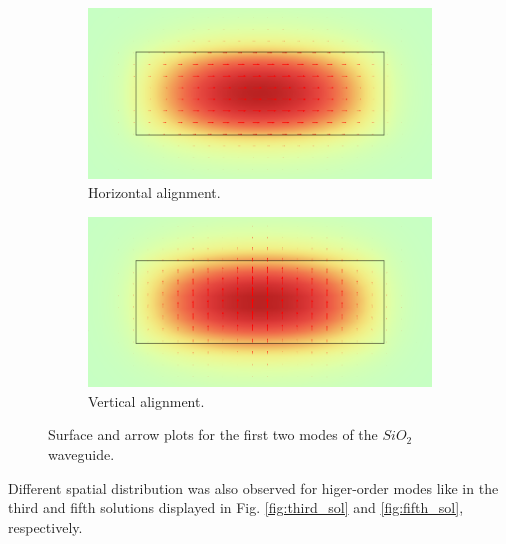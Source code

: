 \documentclass[a4paper,12pt]{article}
\begin{document}
\begin{figure}[H]
    \centering
    \begin{subfigure}{0.45\textwidth}
        \centering
        \includegraphics[scale=0.32]{SiO2_normE_1.png}
        \caption{Horizontal alignment.}
        \label{fig:E_hor}
    \end{subfigure}
    \hfill
    \begin{subfigure}{0.45\textwidth}
        \centering
        \includegraphics[scale=0.32]{SiO2_normE_2.png}
        \caption{Vertical alignment.}
        \label{fig:E_hor}
    \end{subfigure}
    \caption{Surface and arrow plots for the first two modes of the $SiO_2$ waveguide.}
\end{figure}

Different spatial distribution was also observed for higer-order modes like in the third and fifth solutions displayed in Fig. \ref{fig:third_sol} and \ref{fig:fifth_sol}, respectively.
\end{document}
